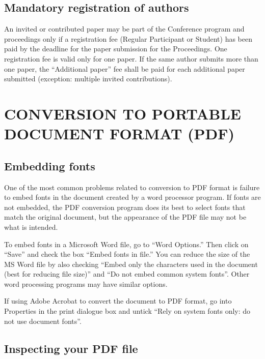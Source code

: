 \subsection{Mandatory registration of authors}

An invited or contributed paper may be part of the Conference program and proceedings only if a registration fee (Regular Participant or Student) has been paid by the deadline for the paper submission for the Proceedings. One registration fee is valid only for one paper. If the same author submits more than one paper, the ``Additional paper'' fee shall be paid for each additional paper submitted (exception: multiple invited contributions).

\section{\uppercase{Conversion to portable document format (PDF)}}

\subsection{Embedding fonts}

One of the most common problems related to conversion to PDF format is failure to embed fonts in the document created by a word processor program. If fonts are not embedded, the PDF conversion program does its best to select fonts that match the original document, but the appearance of the PDF file may not be what is intended.

To embed fonts in a Microsoft Word file, go to ``Word Options.'' Then click on ``Save'' and check the box ``Embed fonts in file.'' You can reduce the size of the MS Word file by also checking ``Embed only the characters used in the document (best for reducing file size)'' and ``Do not embed common system fonts''. Other word processing programs may have similar options. 

If using Adobe Acrobat to convert the document to PDF format, go into Properties in the print dialogue box and untick ``Rely on system fonts only: do not use document fonts''.

\subsection{Inspecting your PDF file}

